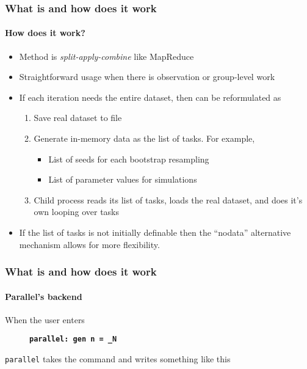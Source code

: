 \documentclass[9pt,\ExtraDocOpts]{beamer}
\begin{document}
\begin{frame} %
\frametitle{What is and how does it work}
\framesubtitle{How does it work?}

\begin{itemize}
\item Method is \textit{split-apply-combine} like MapReduce\pause{}
\item Straightforward usage when there is observation or group-level work\pause{}
\item If each iteration needs the entire dataset, then can be reformulated as\pause{}
\begin{enumerate}
\item Save real dataset to file\pause{}
\item Generate in-memory data as the list of tasks. For example,\pause{}
\begin{itemize}
\item List of seeds for each bootstrap resampling\pause{}
\item List of parameter values for simulations\pause{}
\end{itemize}
\item Child process reads its list of tasks, loads the real dataset, and does it's own looping over tasks\pause{}
\end{enumerate}
\item If the list of tasks is not initially definable then the ``nodata'' alternative mechanism allows for more flexibility.
\end{itemize}

\end{frame}


\begin{frame}
\frametitle{What is and how does it work}
\framesubtitle{Parallel's backend}

When the user enters 

\begin{figure}[fragile]
\small
\centering
{\bf{\tt parallel: gen n = \_N}}
\end{figure} 

{\tt parallel} takes the command and writes something like this\pause{}
\bigskip
\scriptsize


\end{frame}
\end{document}
